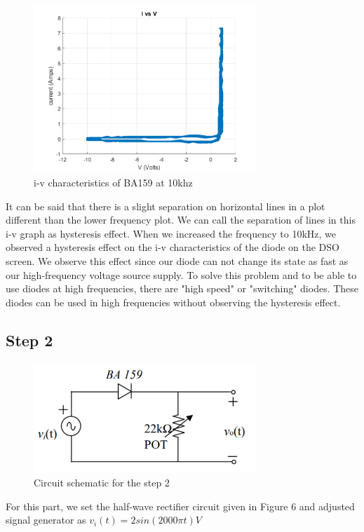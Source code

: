 \documentclass[letterpaper,12pt]{article}
\begin{document}
\begin{figure}[H]
    \centering
    \includegraphics[width = 0.75\textwidth]{1_ba159_10khz.png}
    \caption{i-v characteristics of BA159 at 10khz}
\end{figure} 
It can be said that there is a slight separation on horizontal lines in a plot different than the lower frequency plot. We can call the separation of lines in this i-v graph as hysteresis effect. When we increased the frequency to 10kHz, we observed a hysteresis effect on the i-v characteristics of the diode on the DSO screen. We observe this effect since our diode can not change its state as fast as our high-frequency voltage source supply. To solve this problem and to be able to use diodes at high frequencies, there are "high speed" or "switching" diodes. These diodes can be used in high frequencies without observing the hysteresis effect.

\subsection{Step 2}

\begin{figure}[H]
    \centering
    \includegraphics[width = 0.75\textwidth]{2_1.png}
    \caption{Circuit schematic for the step 2}
\end{figure} 
For this part, we set the half-wave rectifier circuit given in Figure 6 and adjusted signal generator as 
\(
v_i(t)  = 2sin(2000 \pi t) V 
\)
\end{document}
